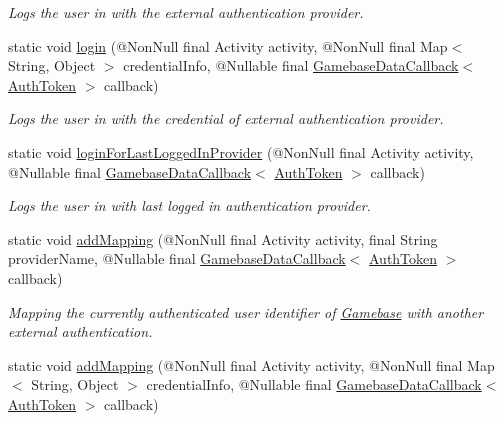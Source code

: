 \begin{DoxyCompactItemize}
\begin{DoxyCompactList}\small\item\em Logs the user in with the external authentication provider. \end{DoxyCompactList}\item 
static void \hyperlink{classcom_1_1toast_1_1android_1_1gamebase_1_1_gamebase_aa9ada2b00de7bcc4f96ba8b85319d444}{login} (@Non\+Null final Activity activity, @Non\+Null final Map$<$ String, Object $>$ credential\+Info, @Nullable final \hyperlink{interfacecom_1_1toast_1_1android_1_1gamebase_1_1_gamebase_data_callback}{Gamebase\+Data\+Callback}$<$ \hyperlink{classcom_1_1toast_1_1android_1_1gamebase_1_1auth_1_1data_1_1_auth_token}{Auth\+Token} $>$ callback)
\begin{DoxyCompactList}\small\item\em Logs the user in with the credential of external authentication provider. \end{DoxyCompactList}\item 
static void \hyperlink{classcom_1_1toast_1_1android_1_1gamebase_1_1_gamebase_a2ac5681db5c8d63aaf02ec1daa4b2933}{login\+For\+Last\+Logged\+In\+Provider} (@Non\+Null final Activity activity, @Nullable final \hyperlink{interfacecom_1_1toast_1_1android_1_1gamebase_1_1_gamebase_data_callback}{Gamebase\+Data\+Callback}$<$ \hyperlink{classcom_1_1toast_1_1android_1_1gamebase_1_1auth_1_1data_1_1_auth_token}{Auth\+Token} $>$ callback)
\begin{DoxyCompactList}\small\item\em Logs the user in with last logged in authentication provider. \end{DoxyCompactList}\item 
static void \hyperlink{classcom_1_1toast_1_1android_1_1gamebase_1_1_gamebase_a1e08fbd00c06712debae39f1e5592ec0}{add\+Mapping} (@Non\+Null final Activity activity, final String provider\+Name, @Nullable final \hyperlink{interfacecom_1_1toast_1_1android_1_1gamebase_1_1_gamebase_data_callback}{Gamebase\+Data\+Callback}$<$ \hyperlink{classcom_1_1toast_1_1android_1_1gamebase_1_1auth_1_1data_1_1_auth_token}{Auth\+Token} $>$ callback)
\begin{DoxyCompactList}\small\item\em Mapping the currently authenticated user identifier of \hyperlink{classcom_1_1toast_1_1android_1_1gamebase_1_1_gamebase}{Gamebase} with another external authentication. \end{DoxyCompactList}\item 
static void \hyperlink{classcom_1_1toast_1_1android_1_1gamebase_1_1_gamebase_a5152b09c5542e5442ed94f0f541ae1d5}{add\+Mapping} (@Non\+Null final Activity activity, @Non\+Null final Map$<$ String, Object $>$ credential\+Info, @Nullable final \hyperlink{interfacecom_1_1toast_1_1android_1_1gamebase_1_1_gamebase_data_callback}{Gamebase\+Data\+Callback}$<$ \hyperlink{classcom_1_1toast_1_1android_1_1gamebase_1_1auth_1_1data_1_1_auth_token}{Auth\+Token} $>$ callback)

\end{DoxyCompactItemize}
